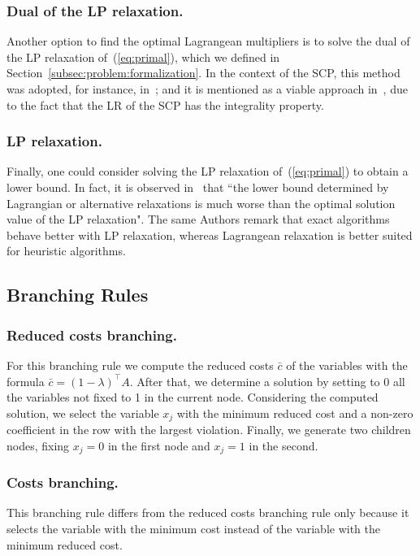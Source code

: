 \documentclass[runningheads]{llncs}
\begin{document}
\subsubsection{Dual of the LP relaxation.} Another option to find the optimal Lagrangean multipliers is to solve the dual of the LP relaxation of~(\ref{eq:primal}), which we defined in Section~\ref{subsec:problem:formalization}. In the context of the SCP, this method was adopted, for instance, in~\cite{beasley-1987-algorithm,balas-ho-2009-set-covering}; and it is mentioned as a viable approach in~\cite{caprara-2000-algorithms}, due to the fact that the LR of the SCP has the integrality property.

\subsubsection{LP relaxation.} Finally, one could consider solving the LP relaxation of~(\ref{eq:primal}) to obtain a lower bound. In fact, it is observed in~\cite{caprara-2000-algorithms} that ``the lower bound determined by Lagrangian or alternative relaxations is much worse than the optimal solution value of the LP relaxation". The same Authors remark that exact algorithms behave better with LP relaxation, whereas Lagrangean relaxation is better suited for heuristic algorithms.   

\subsection{Branching Rules}
\label{subsec:branch-bound:branch}

\subsubsection{Reduced costs branching.} For this branching rule we compute the reduced costs $\bar{c}$ of the variables with the formula $\bar{c} = (1 - \lambda)^\top A$. After that, we determine a solution by setting to 0 all the variables not fixed to 1 in the current node. Considering the computed solution, we select the variable $x_j$ with the minimum reduced cost and a non-zero coefficient in the row with the largest violation. Finally, we generate two children nodes, fixing $x_j = 0$ in the first node and $x_j = 1$ in the second.

\subsubsection{Costs branching.} This branching rule differs from the reduced costs branching rule only because it selects the variable with the minimum cost instead of the variable with the minimum reduced cost.
\end{document}
